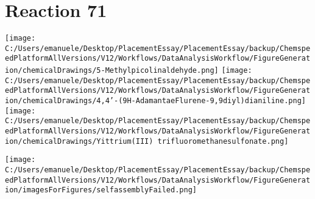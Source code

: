 \documentclass{article}%
\begin{document}
\section*{Reaction 71}%
%
\begin{scheme}[H]%
\begin{minipage}{0.5\textwidth}%
\texttt{[image: C:/Users/emanuele/Desktop/PlacementEssay/PlacementEssay/backup/ChemspeedPlatformAllVersions/V12/Workflows/DataAnalysisWorkflow/FigureGeneration/chemicalDrawings/5-Methylpicolinaldehyde.png]}%
\texttt{[image: C:/Users/emanuele/Desktop/PlacementEssay/PlacementEssay/backup/ChemspeedPlatformAllVersions/V12/Workflows/DataAnalysisWorkflow/FigureGeneration/chemicalDrawings/4,4'-(9H-AdamantaeFlurene-9,9diyl)dianiline.png]}%
\texttt{[image: C:/Users/emanuele/Desktop/PlacementEssay/PlacementEssay/backup/ChemspeedPlatformAllVersions/V12/Workflows/DataAnalysisWorkflow/FigureGeneration/chemicalDrawings/Yittrium(III) trifluoromethanesulfonate.png]}%
\end{minipage}%
\begin{minipage}{0.5\textwidth}%
\begin{center}%
\texttt{[image: C:/Users/emanuele/Desktop/PlacementEssay/PlacementEssay/backup/ChemspeedPlatformAllVersions/V12/Workflows/DataAnalysisWorkflow/FigureGeneration/imagesForFigures/selfassemblyFailed.png]}%
\end{center}%
\end{minipage}%
\caption{Self-assembly of components 3, 13, with Yittrium(III) in a 3.0:1.5:1.0 molar ratio in CH$_3$CN at 60\textdegree C for 40h. These are the reagents (starting materials) for reaction 71.}%
\end{scheme}%
\end{document}
